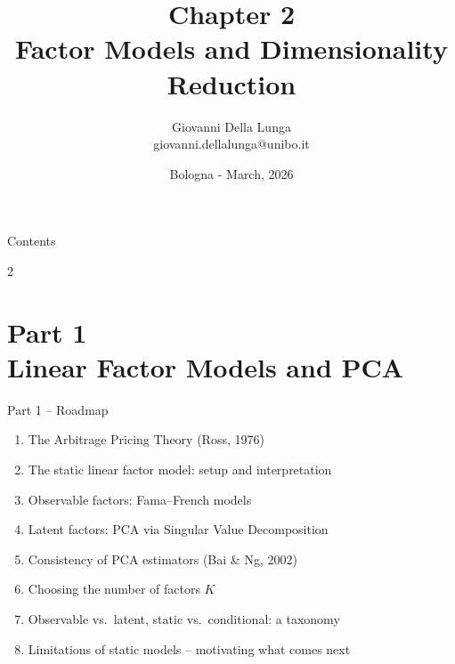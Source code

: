 \documentclass[aspectratio=169]{beamer}
\author{Giovanni Della Lunga\\{\footnotesize giovanni.dellalunga@unibo.it}}
\title{Chapter 2\\Factor Models and Dimensionality Reduction}
\subtitle{} %
\institute{Advanced Topics in Artificial Intelligence}
\date{Bologna - March, 2026}
\begin{document}
%
%
\begin{frame}
\titlepage
\end{frame}
%
%
\AtBeginSubsection{\frame{\subsectionpage}}
%
%
\begin{frame}{Contents}
\begin{multicols}{2}
\tableofcontents[
    sectionstyle=show,
    subsectionstyle=show
]
\end{multicols}
\end{frame}%
%
\section{Part 1\\Linear Factor Models and PCA}
%
\begin{frame}{Part 1 -- Roadmap}
\begin{enumerate}
    \item The Arbitrage Pricing Theory (Ross, 1976)
    \item The static linear factor model: setup and interpretation
    \item Observable factors: Fama--French models
    \item Latent factors: PCA via Singular Value Decomposition
    \item Consistency of PCA estimators (Bai \& Ng, 2002)
    \item Choosing the number of factors $K$
    \item Observable vs.\ latent, static vs.\ conditional: a taxonomy
    \item Limitations of static models -- motivating what comes next
\end{enumerate}

\vspace{0.5em}
\end{frame}
%
\end{document}
